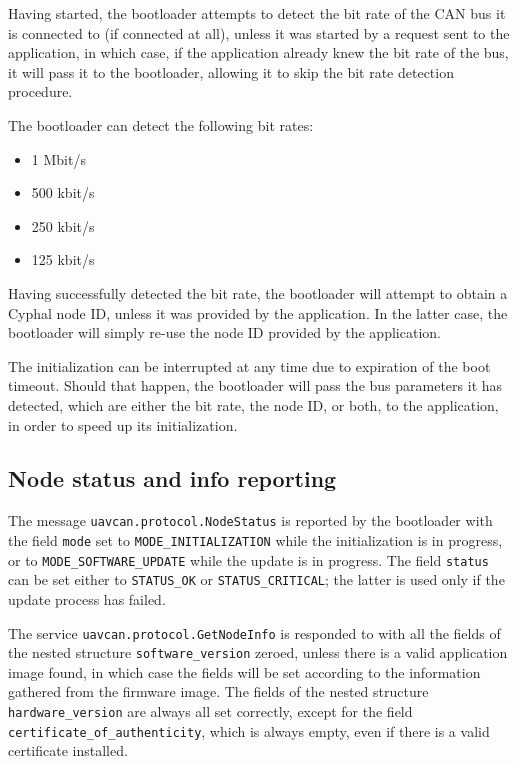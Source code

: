 \documentclass{zubaxdoc}
\begin{document}
Having started, the bootloader attempts to detect the bit rate of the CAN bus it is connected to
(if connected at all), unless it was started by a request sent to the application, in which case,
if the application already knew the bit rate of the bus, it will pass it to the bootloader,
allowing it to skip the bit rate detection procedure.

The bootloader can detect the following bit rates:
\begin{itemize}
	\item 1 Mbit/s
	\item 500 kbit/s
	\item 250 kbit/s
	\item 125 kbit/s
\end{itemize}

Having successfully detected the bit rate, the bootloader will attempt to obtain a Cyphal node ID,
unless it was provided by the application.
In the latter case, the bootloader will simply re-use the node ID provided by the application.

The initialization can be interrupted at any time due to expiration of the boot timeout.
Should that happen, the bootloader will pass the bus parameters it has detected,
which are either the bit rate, the node ID, or both, to the application,
in order to speed up its initialization.

\subsection{Node status and info reporting}

The message \verb|uavcan.protocol.NodeStatus| is reported by the bootloader with the field
\verb|mode| set to \verb|MODE_INITIALIZATION| while the initialization is in progress,
or to \verb|MODE_SOFTWARE_UPDATE| while the update is in progress.
The field \verb|status| can be set either to \verb|STATUS_OK| or \verb|STATUS_CRITICAL|;
the latter is used only if the update process has failed.

The service \verb|uavcan.protocol.GetNodeInfo| is responded to with all the fields of the nested structure
\verb|software_version| zeroed, unless there is a valid application image found,
in which case the fields will be set according to the information gathered from the firmware image.
The fields of the nested structure \verb|hardware_version| are always all set correctly,
except for the field \verb|certificate_of_authenticity|, which is always empty, even if there is
a valid certificate installed.
\end{document}
